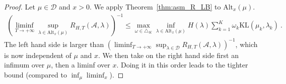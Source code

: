 \documentclass{article}
\newcommand{\KL}{\mathrm{KL}}
\newcommand{\alt}{\mathrm{Alt}}
\begin{document}
\begin{proof}
Let $\mu \in \mathcal D$ and $x > 0$. We apply Theorem~\ref{thm:asm_R_LB} to $\alt_{x}(\mu)$.
\begin{align*}
(\liminf_{T\to +\infty}\sup_{\lambda \in \alt_x(\mu)}R_{H,T}(\mathcal A, \lambda))^{-1}
\le \max_{\omega \in \triangle_K} \inf_{\lambda \in \alt_{x}(\mu)} H(\lambda)\sum_{k=1}^K \omega_k \KL(\mu_k, \lambda_k)
\: .
\end{align*}
The left hand side is larger than $(\liminf_{T\to +\infty}\sup_{\lambda \in \mathcal D} R_{H,T}(\mathcal A, \lambda))^{-1}$, which is now independent of $\mu$ and $x$. We then take on the right hand side first an infimum over $\mu$, then a liminf over $x$. Doing it in this order leads to the tighter bound (compared to $\inf_\mu \liminf_x$).
\end{proof}
\end{document}
